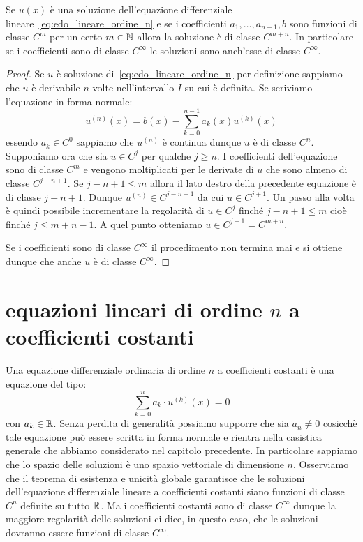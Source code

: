 \begin{theorem}
Se $u(x)$ è una soluzione dell'equazione differenziale lineare~\eqref{eq:edo_lineare_ordine_n} e se i coefficienti $a_1, \dots, a_{n-1}, b$ sono funzioni di classe $C^m$ per un certo $m\in \mathbb N$ allora la soluzione è di classe $C^{m+n}$. In particolare se i coefficienti sono di classe $C^\infty$ le soluzioni sono anch'esse di classe $C^\infty$.
\end{theorem}
%
\begin{proof}
Se $u$ è soluzione di~\eqref{eq:edo_lineare_ordine_n}
per definizione sappiamo che $u$ è derivabile $n$ volte nell'intervallo $I$
su cui è definita.
Se scriviamo l'equazione in forma normale:
\[
  u^{(n)}(x) = b(x) - \sum_{k=0}^{n-1}a_k(x) u^{(k)}(x)
\]
essendo $a_k \in C^0$ sappiamo che $u^{(n)}$ è continua dunque $u$ è di classe $C^n$.
Supponiamo ora che sia $u\in C^j$ per qualche $j\ge n$.
I coefficienti dell'equazione sono di classe $C^m$ e vengono moltiplicati per le derivate di $u$ che sono almeno di classe $C^{j-n+1}$.
Se $j-n+1 \le m$ allora il lato destro della precedente equazione è di classe $j-n+1$.
Dunque $u^{(n)}\in C^{j-n+1}$ da cui $u\in C^{j+1}$.
Un passo alla volta è quindi possibile incrementare la regolarità di $u\in C^j$ finché $j-n+1\le m$ cioè finché $j\le m+n-1$. A quel punto otteniamo $u\in C^{j+1} = C^{m+n}$.

Se i coefficienti sono di classe $C^\infty$ il procedimento non termina mai
e si ottiene dunque che anche $u$ è di classe $C^\infty$.
\end{proof}

\section{equazioni lineari di ordine $n$ a coefficienti costanti}

Una equazione differenziale ordinaria di ordine $n$ a coefficienti costanti è una equazione del tipo:
\mymark{***}
\begin{equation}\label{eq:edo_lineare_omogenea_coeff_costanti}
   \sum_{k=0}^n a_k \cdot u^{(k)}(x) = 0
\end{equation}
con $a_k\in \mathbb R$.
Senza perdita di generalità possiamo supporre che sia $a_n\neq 0$ cosicchè tale equazione può essere scritta in forma normale e rientra nella casistica generale che abbiamo considerato nel capitolo precedente.
In particolare sappiamo che lo spazio delle soluzioni è uno spazio vettoriale di dimensione $n$.
Osserviamo che il teorema di esistenza e unicità globale garantisce che le soluzioni dell'equazione differenziale lineare a coefficienti costanti siano funzioni di classe $C^n$ definite su tutto $\mathbb R$. Ma i coefficienti costanti
sono di classe $C^\infty$ dunque la maggiore regolarità delle soluzioni ci dice, in questo caso, che le soluzioni dovranno essere funzioni di classe $C^\infty$.

